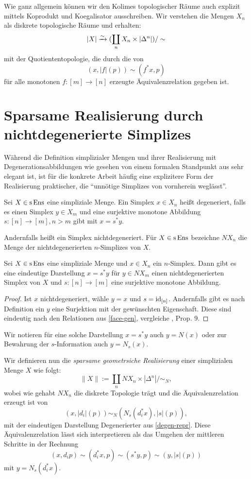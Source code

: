 Wie ganz allgemein können wir den Kolimes topologischer Räume auch
explizit mittels Koprodukt und Koegalisator ausschreiben. Wir
verstehen die Mengen $X_n$ als diskrete topologische Räume und
erhalten:
\[ |X| \xrightarrow[]{\sim} (\coprod_n X_n \times |\Delta^n|) / \sim \]
mit der Quotiententopologie, die durch die von
\[ (x, |f|(p)) \sim (f^* x, p) \]
für alle monotonen $f: [m] \to [n]$ erzeugte Äquivalenzrelation
gegeben ist.

\section{Sparsame Realisierung durch nichtdegenerierte Simplizes}

Während die Definition simplizialer Mengen und ihrer Realisierung mit
Degenerationsabbildungen wie gesehen von einem formalen Standpunkt aus
sehr elegant ist, ist für die konkrete Arbeit häufig eine explizitere
Form der Realisierung praktischer, die ``unnötige Simplizes von
vornherein weglässt''.
\begin{defn}[\cite{GM}, I.2.9]
  Sei $X \in \operatorname{s}\operatorname{Ens}$ eine simpliziale Menge. Ein Simplex $x \in X_n$
  heißt degeneriert, falls es einen Simplex $y \in X_m$ und eine
  surjektive monotone Abbildung $s: [n] \to [m], n > m$ gibt mit $x =
  s^* y$.
\end{defn}
Andernfalls heißt ein Simplex nichtdegeneriert. Für $X \in \operatorname{s}\operatorname{Ens}$
bezeichne $NX_n$ die Menge der nichtdegenerierten $n$-Simplizes von
$X$.
\begin{lemma} \label{degen-repr}
  Sei $X \in \operatorname{s}\operatorname{Ens}$ eine simpliziale Menge und $x \in X_n$ ein
  $n$-Simplex. Dann gibt es eine eindeutige Darstellung $x = s^* y$
  für $y \in NX_m$ einen nichtdegenerierten Simplex von $X$ und $s:
  [n] \to [m]$ eine surjektive monotone Abbildung.
\end{lemma}
\begin{proof}
  Ist $x$ nichtdegeneriert, wähle $y = x$ und $s =
  \operatorname{id}_{[n]}$. Andernfalls gibt es nach Definition ein $y$ eine
  Surjektion mit der gewünschten Eigenschaft. Diese sind eindeutig
  nach den Relationen aus \ref{face-gen}, vergleiche \cite{MIT},
  Prop. 9.
\end{proof}
Wir notieren für eine solche Darstellung $x = s^* y$ auch $y = N(x)$
oder zur Bewahrung der $s$-Information auch $y = N_s(x)$.

Wir definieren nun die \emph{sparsame geometrsiche Realisierung} einer
simplizialen Menge $X$ wie folgt:
\[ \| X \| := \coprod_n NX_n \times |\Delta^n| / \sim_N ,\]
wobei wie gehabt $NX_n$ die diskrete Topologie trägt und die
Äquivalenzrelation erzeugt ist von
\[ (x, |d_i|(p)) \sim_N (N_s(d_i^* x), |s|(p)), \]
mit der eindeutigen Darstellung Degenerierter aus
\ref{degen-repr}. Diese Äquivalenzrelation lässt sich interpretieren
als das Umgehen der mittleren Schritte in der Rechnung
\[ (x, d_i p) \sim (d_i^* x, p) \sim (s^* y, p)
   \sim (y, |s|(p)) \]
mit $y = N_s(d_i^* x)$.
   
